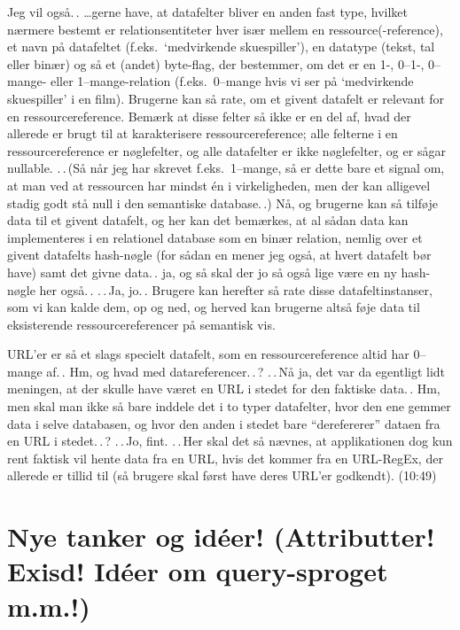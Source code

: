 \documentclass{report}
\begin{document}
Jeg vil også.\,. %
\ldots gerne have, at datafelter bliver en anden fast type, hvilket nærmere bestemt er relationsentiteter hver især mellem en ressource(-reference), et navn på datafeltet (f.eks.\ `medvirkende skuespiller'), en datatype (tekst, tal eller binær) og så et (andet) %
byte-flag, der bestemmer, om det er en 1-, 0--1-, 0--mange- eller 1--mange-relation (f.eks.\ 0--mange hvis vi ser på `medvirkende skuespiller' i en film). Brugerne kan så rate, om et givent datafelt er relevant for en ressourcereference. Bemærk at disse felter så ikke er en del af, hvad der allerede er brugt til at karakterisere ressourcereference; alle felterne i en ressourcereference er nøglefelter, og alle datafelter er ikke nøglefelter, og er sågar nullable. .\,.\,(Så når jeg har skrevet f.eks.\ 1--mange, så er dette bare et signal om, at man ved at ressourcen har mindst én i virkeligheden, men der kan alligevel stadig godt stå null i den semantiske database.\,.) Nå, og brugerne kan så tilføje data til et givent datafelt, og her kan det bemærkes, at al sådan data kan implementeres i en relationel database som en binær relation, nemlig over et givent datafelts hash-nøgle (for sådan en mener jeg også, at hvert datafelt bør have) samt det givne data.\,. ja, og så skal der jo så også lige være en ny hash-nøgle her også.\,. .\,.\,Ja, jo.\,. Brugere kan herefter så rate disse datafeltinstanser, som vi kan kalde dem, op og ned, og herved kan brugerne altså føje data til eksisterende ressourcereferencer på semantisk vis. %

URL'er er så et slags specielt datafelt, som en ressourcereference altid har 0--mange af.\,. Hm, og hvad med datareferencer.\,.\,? .\,.\,Nå ja, det var da egentligt lidt meningen, at der skulle have været en URL i stedet for den faktiske data.\,. Hm, men skal man ikke så bare inddele det i to typer datafelter, hvor den ene gemmer data i selve databasen, og hvor den anden i stedet bare ``derefererer'' dataen fra en URL i stedet.\,.\,? .\,.\,Jo, fint. .\,.\,Her skal det så nævnes, at applikationen dog kun rent faktisk vil hente data fra en URL, hvis det kommer fra en URL-RegEx, der allerede er tillid til (så brugere skal først have deres URL'er godkendt). (10:49)


\section{Nye tanker og idéer! (Attributter! Exisd! Idéer om query-sproget m.m.!)}
\end{document}
